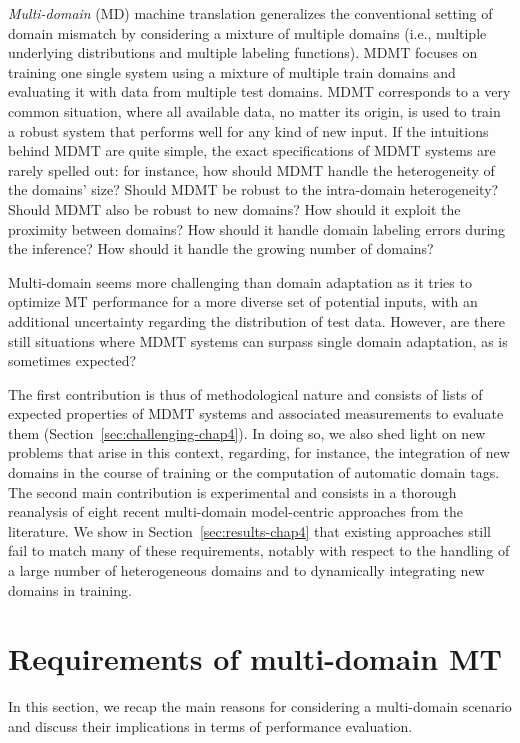 \emph{Multi-domain} (MD) machine translation \citep{Sajjad17neural,Farajian17multidomain,Kobus17domain,Zeng18multidomain,Pham19generic} 
generalizes the conventional setting of domain mismatch by considering a mixture of multiple domains (i.e., multiple underlying distributions and multiple labeling functions). MDMT focuses on training one single system using a mixture of multiple train domains and evaluating it with data from multiple test domains. MDMT corresponds to a very common situation, where all available data, no matter its origin, is used to train a robust system that performs well for any kind of new input. If the intuitions behind MDMT are quite simple, the exact specifications of MDMT systems are rarely spelled out: for instance, how should MDMT handle the heterogeneity of the domains' size? Should MDMT be robust to the intra-domain heterogeneity? Should MDMT also be robust to new domains? How should it exploit the proximity between domains? How should it handle domain labeling errors during the inference? How should it handle the growing number of domains? 

Multi-domain seems more challenging than domain adaptation as it tries to optimize MT performance for a more diverse set of potential inputs, with an additional uncertainty regarding the distribution of test data. However, are there still situations where MDMT systems can surpass single domain adaptation, as is sometimes expected? 

The first contribution is thus of methodological nature and consists of lists of expected properties of MDMT systems and associated measurements to evaluate them (Section~\ref{sec:challenging-chap4}). In doing so, we also shed light on new problems that arise in this context, regarding, for instance, the integration of new domains in the course of training or the computation of automatic domain tags. The second main contribution is experimental and consists in a thorough reanalysis of eight recent multi-domain model-centric approaches from the literature. We show in Section~\ref{sec:results-chap4} that existing approaches still fail to match many of these requirements, notably with respect to the handling of a large number of heterogeneous domains and to dynamically integrating new domains in training.
 
\section{Requirements of multi-domain MT \label{sec:requirements-chap4}}
In this section, we recap the main reasons for considering a multi-domain scenario and discuss their implications in terms of performance evaluation.

